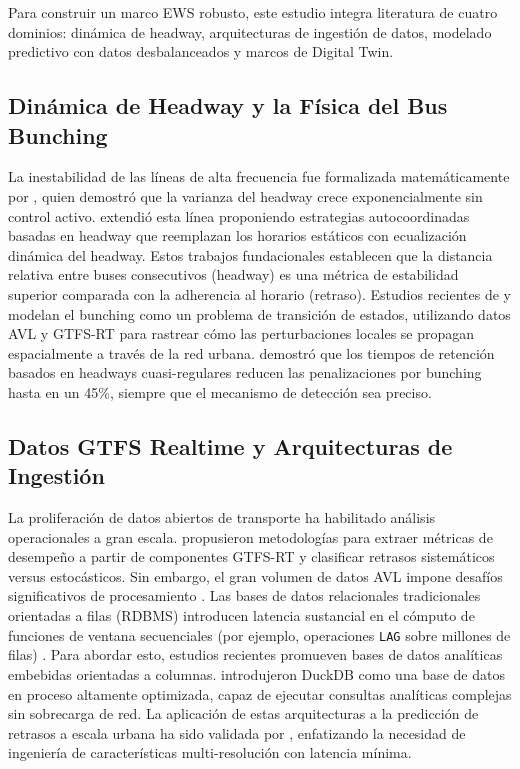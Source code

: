 \documentclass[fleqn,10pt,lineno]{wlpeerj}
\begin{document}
Para construir un marco EWS robusto, este estudio integra literatura de cuatro dominios: din\'amica de headway, arquitecturas de ingesti\'on de datos, modelado predictivo con datos desbalanceados y marcos de Digital Twin.

\subsection{Din\'amica de Headway y la F\'isica del Bus Bunching}

La inestabilidad de las l\'ineas de alta frecuencia fue formalizada matem\'aticamente por \citet{1}, quien demostr\'o que la varianza del headway crece exponencialmente sin control activo. \citet{2} extendi\'o esta l\'inea proponiendo estrategias autocoordinadas basadas en headway que reemplazan los horarios est\'aticos con ecualizaci\'on din\'amica del headway. Estos trabajos fundacionales establecen que la distancia relativa entre buses consecutivos (headway) es una m\'etrica de estabilidad superior comparada con la adherencia al horario (retraso). Estudios recientes de \citet{3} y \citet{8} modelan el bunching como un problema de transici\'on de estados, utilizando datos AVL y GTFS-RT para rastrear c\'omo las perturbaciones locales se propagan espacialmente a trav\'es de la red urbana. \citet{10} demostr\'o que los tiempos de retenci\'on basados en headways cuasi-regulares reducen las penalizaciones por bunching hasta en un 45\%, siempre que el mecanismo de detecci\'on sea preciso.

\subsection{Datos GTFS Realtime y Arquitecturas de Ingesti\'on}

La proliferaci\'on de datos abiertos de transporte ha habilitado an\'alisis operacionales a gran escala. \citet{11} propusieron metodolog\'ias para extraer m\'etricas de desempe\~no a partir de componentes GTFS-RT y clasificar retrasos sistem\'aticos versus estoc\'asticos. Sin embargo, el gran volumen de datos AVL impone desaf\'ios significativos de procesamiento \citep{12}. Las bases de datos relacionales tradicionales orientadas a filas (RDBMS) introducen latencia sustancial en el c\'omputo de funciones de ventana secuenciales (por ejemplo, operaciones \texttt{LAG} sobre millones de filas) \citep{13}. Para abordar esto, estudios recientes promueven bases de datos anal\'iticas embebidas orientadas a columnas. \citet{14} introdujeron DuckDB como una base de datos en proceso altamente optimizada, capaz de ejecutar consultas anal\'iticas complejas sin sobrecarga de red. La aplicaci\'on de estas arquitecturas a la predicci\'on de retrasos a escala urbana ha sido validada por \citet{15}, enfatizando la necesidad de ingenier\'ia de caracter\'isticas multi-resoluci\'on con latencia m\'inima.
\end{document}
